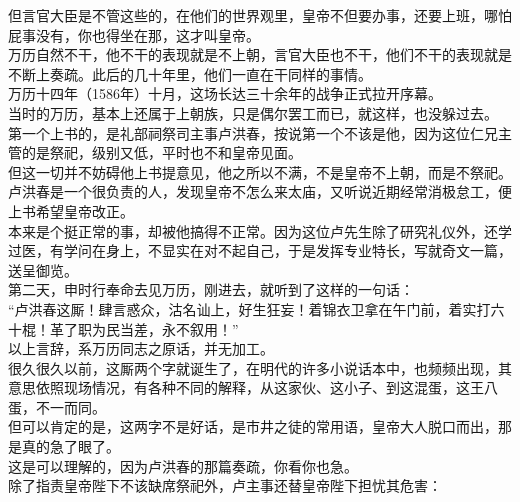 \begin{multicols}{\theparacolNo}
但言官大臣是不管这些的，在他们的世界观里，皇帝不但要办事，还要上班，哪怕屁事没有，你也得坐在那，这才叫皇帝。\\

万历自然不干，他不干的表现就是不上朝，言官大臣也不干，他们不干的表现就是不断上奏疏。此后的几十年里，他们一直在干同样的事情。\\

万历十四年（1586年）十月，这场长达三十余年的战争正式拉开序幕。\\

当时的万历，基本上还属于上朝族，只是偶尔罢工而已，就这样，也没躲过去。\\

第一个上书的，是礼部祠祭司主事卢洪春，按说第一个不该是他，因为这位仁兄主管的是祭祀，级别又低，平时也不和皇帝见面。\\

但这一切并不妨碍他上书提意见，他之所以不满，不是皇帝不上朝，而是不祭祀。\\

卢洪春是一个很负责的人，发现皇帝不怎么来太庙，又听说近期经常消极怠工，便上书希望皇帝改正。\\

本来是个挺正常的事，却被他搞得不正常。因为这位卢先生除了研究礼仪外，还学过医，有学问在身上，不显实在对不起自己，于是发挥专业特长，写就奇文一篇，送呈御览。\\

第二天，申时行奉命去见万历，刚进去，就听到了这样的一句话：\\

“卢洪春这厮！肆言惑众，沽名讪上，好生狂妄！着锦衣卫拿在午门前，着实打六十棍！革了职为民当差，永不叙用！”\\

以上言辞，系万历同志之原话，并无加工。\\

很久很久以前，这厮两个字就诞生了，在明代的许多小说话本中，也频频出现，其意思依照现场情况，有各种不同的解释，从这家伙、这小子、到这混蛋，这王八蛋，不一而同。\\

但可以肯定的是，这两字不是好话，是市井之徒的常用语，皇帝大人脱口而出，那是真的急了眼了。\\

这是可以理解的，因为卢洪春的那篇奏疏，你看你也急。\\

除了指责皇帝陛下不该缺席祭祀外，卢主事还替皇帝陛下担忧其危害：\\


\end{multicols}
